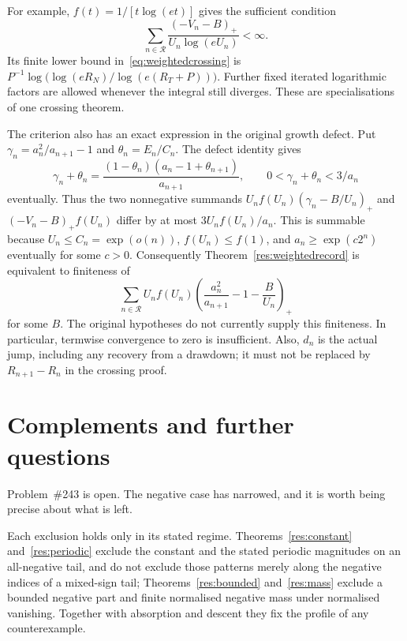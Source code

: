 \documentclass[11pt]{article}
\begin{document}
For example, $f(t)=1/[t\log(et)]$ gives the sufficient condition
\[
 \sum_{n\in\mathcal R}\frac{(-V_n-B)_+}{U_n\log(eU_n)}<\infty.
\]
Its finite lower bound in~\eqref{eq:weightedcrossing} is
$P^{-1}\log\bigl(\log(eR_N)/\log(e(R_T+P))\bigr)$.
Further fixed iterated logarithmic factors are allowed whenever the integral
still diverges. These are specialisations of one crossing theorem.

The criterion also has an exact expression in the original growth defect.
Put $\gamma_n=a_n^2/a_{n+1}-1$ and $\theta_n=E_n/C_n$. The defect identity
gives
\[
 \gamma_n+\theta_n=
 \frac{(1-\theta_n)(a_n-1+\theta_{n+1})}{a_{n+1}},
 \qquad 0<\gamma_n+\theta_n<3/a_n
\]
eventually. Thus the two nonnegative summands
$U_nf(U_n)(\gamma_n-B/U_n)_+$ and $(-V_n-B)_+f(U_n)$ differ by at most
$3U_nf(U_n)/a_n$. This is summable because
$U_n\le C_n=\exp(o(n))$, $f(U_n)\le f(1)$, and
$a_n\ge\exp(c2^n)$ eventually for some $c>0$.
Consequently Theorem~\ref{res:weightedrecord} is equivalent to finiteness of
\begin{equation}\label{eq:weightedgrowth}
 \sum_{n\in\mathcal R}U_nf(U_n)
 \left(\frac{a_n^2}{a_{n+1}}-1-\frac B{U_n}\right)_+
\end{equation}
for some $B$. The original hypotheses do not currently supply this
finiteness. In particular, termwise convergence to zero is insufficient.
Also, $d_n$ is the actual jump, including any recovery from a drawdown; it
must not be replaced by $R_{n+1}-R_n$ in the crossing proof.

\section{Complements and further questions}\label{sec:open}

Problem~\#243 is open.  The negative case has narrowed, and it is worth being
precise about what is left.

Each exclusion holds only in its stated regime.  Theorems~\ref{res:constant}
and~\ref{res:periodic} exclude the constant and the stated periodic magnitudes
on an all-negative tail, and do not exclude those patterns merely along the
negative indices of a mixed-sign tail; Theorems~\ref{res:bounded}
and~\ref{res:mass} exclude a bounded negative part and finite normalised
negative mass under normalised vanishing.  Together with absorption and descent
they fix the profile of any counterexample.
\end{document}
